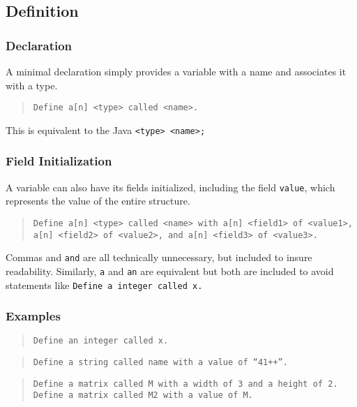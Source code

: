 \documentclass{article}
\newcommand{\code}[1]{\texttt{#1}}
\newcommand{\codeblock}[1]{\begin{quote}\code{#1}\end{quote}}
\begin{document}
\subsection{Definition}
\subsubsection{Declaration}
A minimal declaration simply provides a variable with a name and associates it with a type.

\codeblock{Define a[n] <type> called <name>.}

\noindent This is equivalent to the Java \code{<type> <name>;} 

\subsubsection{Field Initialization}
A variable can also have its fields initialized, including the field \code{value}, which represents the value of the entire structure.

\codeblock{Define a[n] <type> called <name> with a[n] <field1> of <value1>, a[n] <field2> of <value2>, and a[n] <field3> of <value3>.}

\noindent Commas and \code{and} are all technically unnecessary, but included to insure readability. Similarly, \code{a} and \code{an} are equivalent but both are included to avoid statements like \code{Define a integer called x.}
\subsubsection{Examples}

\codeblock{Define an integer called x.}

\codeblock{Define a string called name with a value of ``41++''.}

\codeblock{Define a matrix called M with a width of 3 and a height of 2. Define a matrix called M2 with a value of M.}
\end{document}
